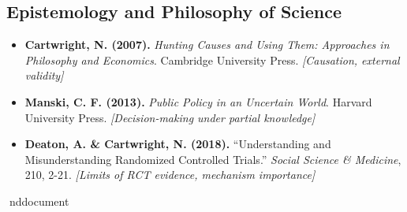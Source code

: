 \documentclass[11pt,a4paper]{article}
\theoremstyle{definition}
\begin{document}
\subsection{Epistemology and Philosophy of Science}

\begin{itemize}

\item \textbf{Cartwright, N. (2007).} 
\textit{Hunting Causes and Using Them: Approaches in Philosophy and Economics}. 
Cambridge University Press.
\textit{[Causation, external validity]}

\item \textbf{Manski, C. F. (2013).} 
\textit{Public Policy in an Uncertain World}. 
Harvard University Press.
\textit{[Decision-making under partial knowledge]}

\item \textbf{Deaton, A. \& Cartwright, N. (2018).} 
``Understanding and Misunderstanding Randomized Controlled Trials.'' 
\textit{Social Science \& Medicine}, 210, 2-21.
\textit{[Limits of RCT evidence, mechanism importance]}

\end{itemize}


nd{document}
\end{document}
